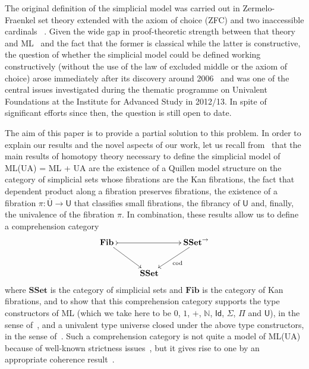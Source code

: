 \documentclass[reqno,10pt,a4paper,oneside,draft]{amsart}
\numberwithin{equation}{section}
\theoremstyle{mythm}
\theoremstyle{mydef}
\theoremstyle{myrmk}
\newcommand{\ie}{\text{i.e.\ }}
\newcommand{\co}{\colon}
\newcommand{\SSet}{\mathbf{SSet}}
\newcommand{\UU}{\overline{\mathsf{U}}}
\newcommand{\U}{\mathsf{U}}
\begin{document}
The original definition of the simplicial model  was carried out in  Zermelo-Fraenkel set theory extended with the axiom of choice (ZFC) and two inaccessible cardinals~\cite[Theorem~3.4.3]{voevodsky-simplicial-model} . Given the wide gap in proof-theoretic strength between that theory and ML~\cite{GrifforE:strsml} and the fact that the former is classical  while the latter is constructive,  the question of whether the simplicial model could be defined working constructively (\ie without the use of the law of excluded middle or the axiom of choice) arose immediately after its discovery around 2006~\cite{KapulkinC:uniss,StreicherT:modtts,VoevodskyV:notts} and was one of the central issues investigated during the thematic programme on Univalent Foundations at the Institute for Advanced Study in 2012/13. In spite of  significant efforts since then, the question is still open to date.

The aim of this paper is to provide a partial solution to this problem.  In order to
explain our results and the novel aspects of our work, let us recall from~\cite{voevodsky-simplicial-model} that the main results of  homotopy theory necessary 
to define the simplicial model of ML(UA) = ML + UA are 
the existence of a Quillen
model structure on the category of simplicial sets whose fibrations are the Kan fibrations, 
 the fact that dependent product along a fibration preserves fibrations,
 the existence of a fibration $\pi \co \UU \to \U$ that classifies small fibrations, 
the fibrancy of $\U$ and, finally, the univalence of the fibration $\pi$. In combination, these results
allow us to define a comprehension category 
\[
\begin{gathered}
\xymatrix{
\mathbf{Fib}\,  \ar[dr] \ar@{>->}[rr] & & \SSet^{\to} \ar[dl]^{\mathrm{cod}} \\ 
 & \SSet &  }
 \end{gathered}
\]
where $\SSet$ is the category of simplicial sets 
and $\mathbf{Fib}$ is the category of Kan fibrations, 
and to show that this comprehension category supports the type
constructors of ML (which we take here to be $0$, $1$, $+$, $\mathbb{N}$, 
$\mathsf{Id}$, $\Sigma$, $\Pi$ and $\mathsf{U}$),
in the sense of~\cite{LumsdaineP:locuoc},  and a univalent type universe closed under the above type
constructors,  in the sense of~\cite{ShulmanM:allths}. Such a comprehension category is not quite a 
model of ML(UA) because of well-known strictness issues~\cite{HofmannM:intttl}, but it gives rise to one
by an appropriate coherence result~\cite{voevodsky-simplicial-model,LumsdaineP:locuoc}.
\end{document}
